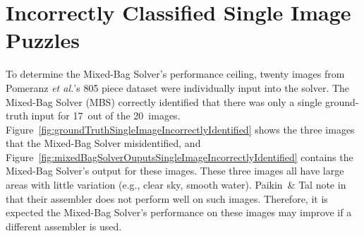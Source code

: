 \chapter{Incorrectly Classified Single Image Puzzles}\label{chap:incorreclyClassifiedSingleImages}

To determine the Mixed-Bag Solver's performance ceiling, twenty images from Pomeranz \textit{et al.}'s 805 piece dataset were individually input into the solver.  The Mixed-Bag Solver (MBS) correctly identified that there was only a single ground-truth input for 17~out of the 20~images.  Figure~\ref{fig:groundTruthSingleImageIncorrectlyIdentified} shows the three images that the Mixed-Bag Solver misidentified, and Figure~\ref{fig:mixedBagSolverOuputsSingleImageIncorrectlyIdentified} contains the Mixed-Bag Solver's output for these images.  These three images all have large areas with little variation (e.g., clear sky, smooth water).  Paikin~\& Tal note in~\cite{paikin2015} that their assembler does not perform well on such images.  Therefore, it is expected the Mixed-Bag Solver's performance on these images may improve if a different assembler is used.

